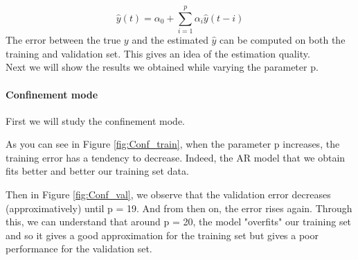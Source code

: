\documentclass[11pt]{article}
\begin{document}
\begin{equation*}
    \hat{y}(t)=\alpha_0+\sum_{i=1}^p \alpha_i\hat{y}(t-i)
\end{equation*}
The error between the true $y$ and the estimated $\hat{y}$ can be computed on both the training and validation set. This gives an idea of the estimation quality.\\

Next we will show the results we obtained while varying the parameter p.
\newpage 

\paragraph{Confinement mode}
First we will study the confinement mode.

As you can see in Figure \ref{fig:Conf_train}, when the parameter p increases, the training error has a tendency to decrease. Indeed, the AR model that we obtain fits better and better our training set data.


Then in Figure \ref{fig:Conf_val}, we observe that the validation error decreases (approximatively) until p = 19. And from then on, the error rises again. Through this, we can understand that around p = 20, the model "overfits" our training set and so it gives a good approximation for the training set but gives a poor performance for the validation set.
\end{document}
